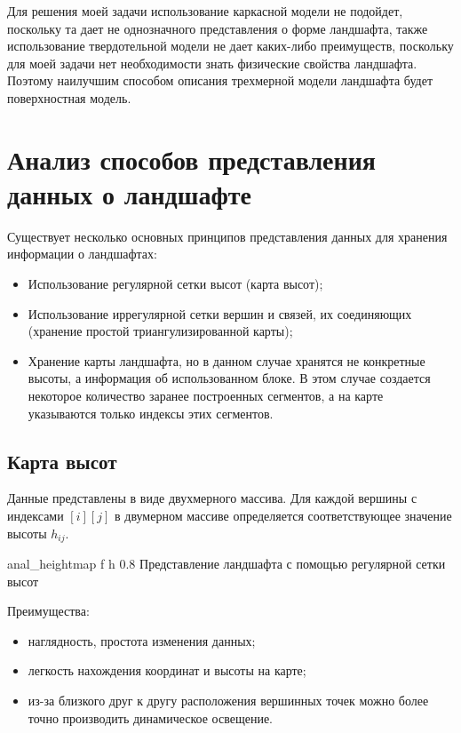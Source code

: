 Для решения моей задачи использование каркасной модели не подойдет, поскольку та дает не однозначного представления о форме ландшафта, также использование твердотельной модели не дает каких-либо преимуществ, поскольку для моей задачи нет необходимости знать физические свойства ландшафта. Поэтому наилучшим способом описания трехмерной модели ландшафта будет поверхностная модель.


\section{Анализ способов представления данных о ландшафте}

Существует несколько основных принципов представления данных для хранения информации о ландшафтах:

\begin{itemize}[label=--]
	\item Использование регулярной сетки высот (карта высот);
	\item Использование иррегулярной сетки вершин и связей, их соединяющих (хранение простой триангулизированной карты);
	\item Хранение карты ландшафта, но в данном случае хранятся не конкретные высоты, а информация об использованном блоке. В этом случае создается некоторое количество заранее построенных сегментов, а на карте указываются только индексы этих сегментов.
\end{itemize}

\subsection{Карта высот}

Данные представлены в виде двухмерного массива. Для каждой вершины с индексами $[i][j]$ в двумерном массиве определяется соответствующее значение высоты $h_{ij}$.

\clearpage

{anal_heightmap} %
{f} %
{h} %
{0.8\textwidth} %
{Представление ландшафта с помощью регулярной сетки высот} %

Преимущества:

\begin{itemize}[label=--]
	\item наглядность, простота изменения данных;
	\item легкость нахождения координат и высоты на карте;
	\item из-за близкого друг к другу расположения вершинных точек можно 
	более точно производить динамическое освещение.
\end{itemize}

